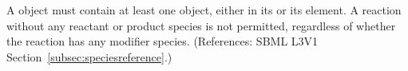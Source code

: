 A \Reaction object must contain at least one \SpeciesReference object,
either in its  or its 
element.  A reaction without any reactant or product species is not
permitted, regardless of whether the reaction has any modifier species.
(References: SBML L3V1 Section~\ref{subsec:speciesreference}.)
